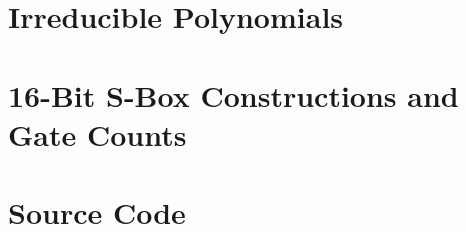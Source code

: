 \documentclass[11pt,american]{report}
\begin{document}
\appendix
\chapter{Irreducible Polynomials}

\chapter{16-Bit S-Box Constructions and Gate Counts}

\chapter{Source Code} \label{app:sourceCode}

\end{document}
